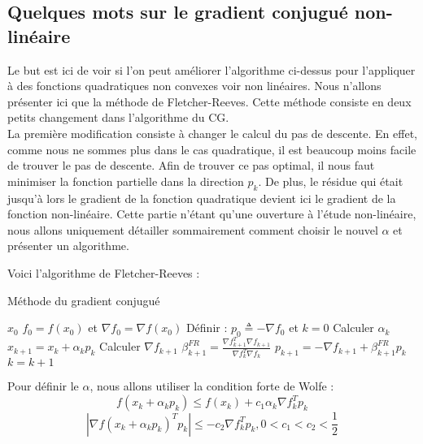 \subsection{Quelques mots sur le gradient conjugué non-linéaire}
Le but est ici de voir si l'on peut améliorer l'algorithme ci-dessus pour l'appliquer à des fonctions quadratiques non convexes voir non linéaires. Nous n'allons présenter ici que la méthode de Fletcher-Reeves. Cette méthode consiste en deux petits changement dans l'algorithme du CG. \\

La première modification consiste à changer le calcul du pas de descente. En effet, comme nous ne sommes plus dans le cas quadratique, il est beaucoup moins facile de trouver le pas de descente. Afin de trouver ce pas optimal, il nous faut minimiser la fonction partielle dans la direction $p_k$. De plus, le résidue qui était jusqu'à lors le gradient de la fonction quadratique devient ici le gradient de la fonction non-linéaire. Cette partie n'étant qu'une ouverture à l'étude non-linéaire, nous allons uniquement détailler sommairement comment choisir le nouvel $\alpha$ et présenter un algorithme. 

Voici l'algorithme de Fletcher-Reeves : 

\begin{algorithm}[H]
	\caption{Méthode du gradient conjugué}
	\begin{algorithmic}[1]
		\Require $x_0$
		\State $f_0 = f(x_0)$ et $\nabla f_0 = \nabla f(x_0)$
		\State Définir : $p_0 \triangleq -\nabla f_0$ et $k  =0$
		\State Calculer $\alpha_k$
		\State $x_{k+1} = x_k + \alpha_k p_k$
		\State Calculer $\nabla f_{k+1}$
		\State 	$\beta^{FR}_{k+1} = \frac{\nabla f_{k+1}^T\nabla f_{k+1}}{\nabla f_k^T\nabla f_k}$
		\State $p_{k+1} = -\nabla f_{k+1}+\beta^{FR}_{k+1} p_k$
		\State $k = k+1$
		\EndWhile

	\end{algorithmic}
\end{algorithm}

Pour définir le $\alpha$, nous allons utiliser la condition forte de Wolfe : 
\begin{equation}
f(x_k + \alpha_kp_k) \leq f(x_k) + c_1\alpha_k \nabla f_k^Tp_k
\end{equation}
\begin{equation}
|\nabla f(x_k + \alpha_kp_k)^T p_k| \leq -c_2 \nabla f_k^Tp_k, 0 < c_1 < c_2 < \frac{1}{2}
\end{equation}

